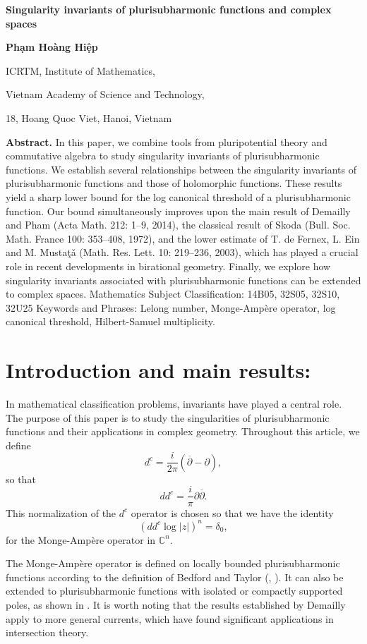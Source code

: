 \documentclass[a4paper,oneside,reqno,11pt]{article}
\def\n{\noindent}
\def\n{\noindent}
\begin{document}
\centerline{\large\bf Singularity invariants of plurisubharmonic functions and complex spaces}
\vskip 0.5cm
\n
\centerline{\bf Ph\d{a}m Ho\`ang Hi\d{\^e}p}
\vskip3mm
\centerline{ICRTM, Institute of Mathematics,}
\centerline{Vietnam Academy of Science and Technology,}
\centerline{18, Hoang Quoc Viet, Hanoi, Vietnam}
\vskip 1cm
\n
{\bf Abstract.} In this paper, we combine tools from pluripotential theory and commutative algebra to study singularity invariants of plurisubharmonic functions. We establish several relationships between the singularity invariants of plurisubharmonic functions and those of holomorphic functions. These results yield a sharp lower bound for the log canonical threshold of a plurisubharmonic function. Our bound simultaneously improves upon the main result of Demailly and Pham (Acta Math. 212: 1--9, 2014), the classical result of Skoda (Bull. Soc. Math. France 100: 353--408, 1972), and the lower estimate of T. de Fernex, L. Ein and M. Musta\c{t}\v{a} (Math. Res. Lett. 10: 219--236, 2003), which has played a crucial role in recent developments in birational geometry. Finally, we explore how singularity invariants associated with plurisubharmonic functions can be extended to complex spaces.
\vskip 0.5cm
 Mathematics Subject Classification: 14B05, 32S05, 32S10, 32U25
\vskip0.5cm
\n Keywords and Phrases:  Lelong number, Monge-Amp\`ere operator, log canonical threshold, Hilbert-Samuel multiplicity.

\n
\section{Introduction and main results:}

In mathematical classification problems, invariants have played a central role. The purpose of this paper is to study the singularities of plurisubharmonic functions and their applications in complex geometry. Throughout this article, we define 
$$d^c=\frac {i} {2\pi} (\overline {\partial} - \partial),$$
so that 
$$dd^c=\frac {i} {\pi}\partial \overline {\partial}.$$ 
This normalization of the $d^c$ operator is chosen so that we have the identity
$$(dd^c\log|z|)^n=\delta_0,$$
for the Monge-Amp\`{e}re operator in $\mathbb C^n$. 

The Monge-Amp\`{e}re operator is defined on locally bounded plurisubharmonic functions according to the definition of Bedford and Taylor (\cite{BT76}, \cite{BT82}). It can also be extended to plurisubharmonic functions with isolated or compactly supported poles, as shown in \cite{De93a}. It is worth noting that the results established by Demailly apply to more general currents, which have found significant applications in intersection theory.
\end{document}

